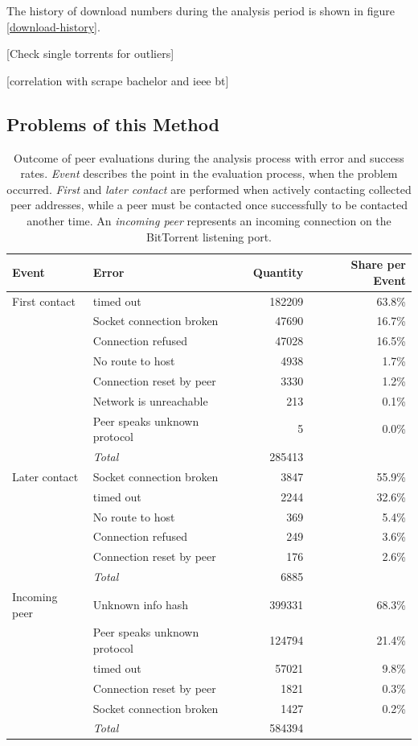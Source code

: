 \documentclass[10pt, a4paper, twoside, headsepline]{scrbook}
\renewcommand{\_}{\origunderscore\allowbreak}
\begin{document}
The history of download numbers during the analysis period is shown in figure \ref{download-history}.

[Check single torrents for outliers]

[correlation with scrape bachelor and ieee bt]

\subsection{Problems of this Method}
\label{problems}
\begin{table}
\centering
\begin{tabular}{llrr}
\toprule
Event & Error & Quantity & Share per Event \\
\midrule
First contact & timed out & 182209 & 63.8\% \\
& Socket connection broken & 47690 & 16.7\% \\
 & Connection refused & 47028 & 16.5\% \\
 & No route to host & 4938 & 1.7\% \\
 & Connection reset by peer & 3330 & 1.2\% \\
 &  Network is unreachable & 213 & 0.1\% \\
 & Peer speaks unknown protocol & 5 & 0.0\% \\
 & \textit{Total} & 285413 &  \\
\midrule
Later contact & Socket connection broken & 3847 & 55.9\% \\
 & timed out & 2244 & 32.6\% \\
 &  No route to host & 369 & 5.4\% \\
 & Connection refused & 249 & 3.6\% \\
 &  Connection reset by peer & 176 & 2.6\% \\
 & \textit{Total} & 6885 &  \\
\midrule
Incoming peer & Unknown info hash & 399331 & 68.3\% \\
 & Peer speaks unknown protocol & 124794 & 21.4\% \\
 & timed out & 57021 & 9.8\% \\
 & Connection reset by peer & 1821 & 0.3\% \\
 & Socket connection broken & 1427 & 0.2\% \\
 & \textit{Total} & 584394 &  \\
\bottomrule
\end{tabular}
\caption[Reasons for failure of peer evaluation]{Outcome of peer evaluations during the analysis process with error and success rates. \emph{Event} describes the point in the evaluation process, when the problem occurred. \emph{First} and \emph{later contact} are performed when actively contacting collected peer addresses, while a peer must be contacted once successfully to be contacted another time. An \emph{incoming peer} represents an incoming connection on the BitTorrent listening port.} %
\label{connection-failure}
\end{table}
\end{document}
